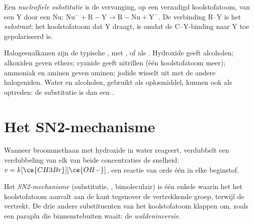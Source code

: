 \begin{definition}\label{def:b1:nucleophilic-substitution:substitution}
Een \emph{nucleofiele substitutie} is de
vervanging, op een verzadigd koolstofatoom, van een  Y
door een  Nu: $\mathrm{Nu^-} + \mathrm{R{-}Y} \to \mathrm{R{-}Nu} +
\mathrm{Y^-}$. De verbinding R--Y is het
\emph{substraat}; het koolstofatoom dat Y draagt, is
 omdat de C--Y-binding naar Y toe gepolariseerd is.
\end{definition}

Halogeenalkanen zijn de typische , met ,  of
 als . Hydroxide geeft alcoholen; alkoxiden
geven ethers; cyanide geeft nitrillen (één koolstofatoom meer); ammoniak
en aminen geven aminen; jodide wisselt uit met de andere halogeniden.
Water en alcoholen, gebruikt als oplosmiddel, kunnen ook als 
optreden: de substitutie is dan een .

\section{Het SN2-mechanisme}

Wanneer broommethaan met hydroxide in water reageert, verdubbelt een
verdubbeling van elk van beide concentraties de snelheid:
$v = k[\ce{CH3Br}][\ce{OH-}]$, een reactie van orde één in elke beginstof.

\begin{definition}\label{def:b1:nucleophilic-substitution:sn2}
Het \emph{SN2-mechanisme} (substitutie,
, bimoleculair) is één enkele  waarin het
 het koolstofatoom aanvalt aan de kant tegenover de vertrekkende
groep, terwijl de  vertrekt. De drie andere
substituenten van het koolstofatoom klappen om, zoals een paraplu die
binnenstebuiten waait: de
\emph{waldeninversie}.
\end{definition}

